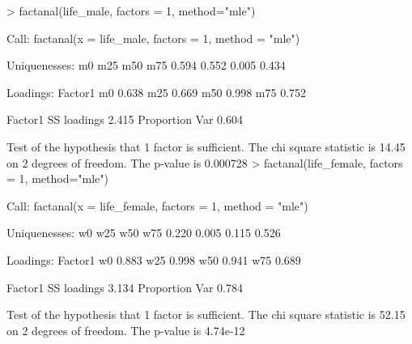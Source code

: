 \documentclass[
]{article}
\newenvironment{Shaded}{\begin{snugshade}}{\end{snugshade}}
\newcommand{\AttributeTok}[1]{\textcolor[rgb]{0.77,0.63,0.00}{#1}}
\newcommand{\DecValTok}[1]{\textcolor[rgb]{0.00,0.00,0.81}{#1}}
\newcommand{\FloatTok}[1]{\textcolor[rgb]{0.00,0.00,0.81}{#1}}
\newcommand{\FunctionTok}[1]{\textcolor[rgb]{0.00,0.00,0.00}{#1}}
\newcommand{\NormalTok}[1]{#1}
\newcommand{\SpecialCharTok}[1]{\textcolor[rgb]{0.00,0.00,0.00}{#1}}
\newcommand{\StringTok}[1]{\textcolor[rgb]{0.31,0.60,0.02}{#1}}
\begin{document}
\begin{Shaded}
\begin{Highlighting}[]
\SpecialCharTok{\textgreater{}} \FunctionTok{factanal}\NormalTok{(life\_male, }\AttributeTok{factors =} \DecValTok{1}\NormalTok{, }\AttributeTok{method=}\StringTok{"mle"}\NormalTok{)}

\NormalTok{Call}\SpecialCharTok{:}
\FunctionTok{factanal}\NormalTok{(}\AttributeTok{x =}\NormalTok{ life\_male, }\AttributeTok{factors =} \DecValTok{1}\NormalTok{, }\AttributeTok{method =} \StringTok{"mle"}\NormalTok{)}

\NormalTok{Uniquenesses}\SpecialCharTok{:}
\NormalTok{   m0   m25   m50   m75 }
\FloatTok{0.594} \FloatTok{0.552} \FloatTok{0.005} \FloatTok{0.434} 

\NormalTok{Loadings}\SpecialCharTok{:}
\NormalTok{    Factor1}
\NormalTok{m0  }\FloatTok{0.638}  
\NormalTok{m25 }\FloatTok{0.669}  
\NormalTok{m50 }\FloatTok{0.998}  
\NormalTok{m75 }\FloatTok{0.752}  

\NormalTok{               Factor1}
\NormalTok{SS loadings      }\FloatTok{2.415}
\NormalTok{Proportion Var   }\FloatTok{0.604}

\NormalTok{Test of the hypothesis that }\DecValTok{1}\NormalTok{ factor is sufficient.}
\NormalTok{The chi square statistic is }\FloatTok{14.45}\NormalTok{ on }\DecValTok{2}\NormalTok{ degrees of freedom.}
\NormalTok{The p}\SpecialCharTok{{-}}\NormalTok{value is }\FloatTok{0.000728} 
\SpecialCharTok{\textgreater{}} \FunctionTok{factanal}\NormalTok{(life\_female, }\AttributeTok{factors =} \DecValTok{1}\NormalTok{, }\AttributeTok{method=}\StringTok{"mle"}\NormalTok{)}

\NormalTok{Call}\SpecialCharTok{:}
\FunctionTok{factanal}\NormalTok{(}\AttributeTok{x =}\NormalTok{ life\_female, }\AttributeTok{factors =} \DecValTok{1}\NormalTok{, }\AttributeTok{method =} \StringTok{"mle"}\NormalTok{)}

\NormalTok{Uniquenesses}\SpecialCharTok{:}
\NormalTok{   w0   w25   w50   w75 }
\FloatTok{0.220} \FloatTok{0.005} \FloatTok{0.115} \FloatTok{0.526} 

\NormalTok{Loadings}\SpecialCharTok{:}
\NormalTok{    Factor1}
\NormalTok{w0  }\FloatTok{0.883}  
\NormalTok{w25 }\FloatTok{0.998}  
\NormalTok{w50 }\FloatTok{0.941}  
\NormalTok{w75 }\FloatTok{0.689}  

\NormalTok{               Factor1}
\NormalTok{SS loadings      }\FloatTok{3.134}
\NormalTok{Proportion Var   }\FloatTok{0.784}

\NormalTok{Test of the hypothesis that }\DecValTok{1}\NormalTok{ factor is sufficient.}
\NormalTok{The chi square statistic is }\FloatTok{52.15}\NormalTok{ on }\DecValTok{2}\NormalTok{ degrees of freedom.}
\NormalTok{The p}\SpecialCharTok{{-}}\NormalTok{value is }\FloatTok{4.74e{-}12} 
\end{Highlighting}
\end{Shaded}
\end{document}
